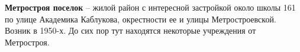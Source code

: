 \textbf{Метростроя поселок} – жилой район с интересной застройкой около школы 161 по улице Академика Каблукова, окрестности ее и улицы Метростроевской. Возник в 1950-х. До сих пор тут находятся некоторые учреждения от Метростроя.\\

\medskip












